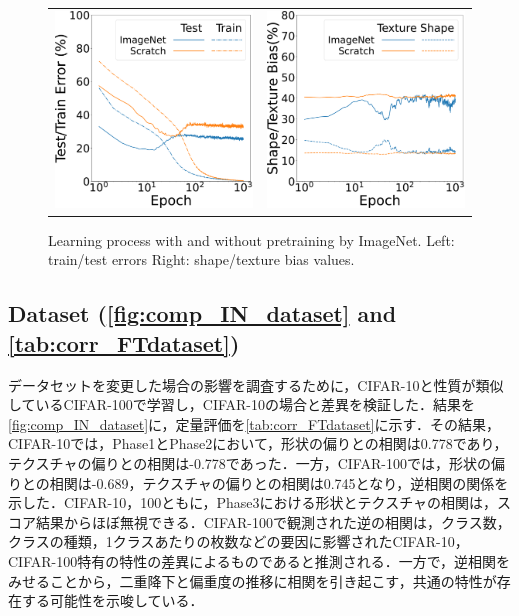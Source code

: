 \begin{figure}[htb]
\centering
   \begin{tabular}{cc}
      \includegraphics[keepaspectratio, width=0.45\linewidth]{fig/INSR_learning_curv.pdf} &
      \hspace{5pt}
      \includegraphics[keepaspectratio, width=0.45\linewidth]{fig/INSR_sha_tex.pdf}
   \end{tabular}
\caption[Learning process with and without pretraining by ImageNet.]{Learning process with and without pretraining by ImageNet. Left: train/test errors Right: shape/texture bias values.}
\label{fig:comp_INSR}
\end{figure}

\newpage

\subsection[Dataset]{Dataset (\cref{fig:comp_IN_dataset} and \cref{tab:corr_FTdataset})}
データセットを変更した場合の影響を調査するために，CIFAR-10と性質が類似しているCIFAR-100で学習し，CIFAR-10の場合と差異を検証した．結果を\cref{fig:comp_IN_dataset}に，定量評価を\cref{tab:corr_FTdataset}に示す．その結果，CIFAR-10では，Phase1とPhase2において，形状の偏りとの相関は0.778であり，テクスチャの偏りとの相関は-0.778であった．一方，CIFAR-100では，形状の偏りとの相関は-0.689，テクスチャの偏りとの相関は0.745となり，逆相関の関係を示した．CIFAR-10，100ともに，Phase3における形状とテクスチャの相関は，スコア結果からほぼ無視できる．CIFAR-100で観測された逆の相関は，クラス数，クラスの種類，1クラスあたりの枚数などの要因に影響されたCIFAR-10，CIFAR-100特有の特性の差異によるものであると推測される．一方で，逆相関をみせることから，二重降下と偏重度の推移に相関を引き起こす，共通の特性が存在する可能性を示唆している．

